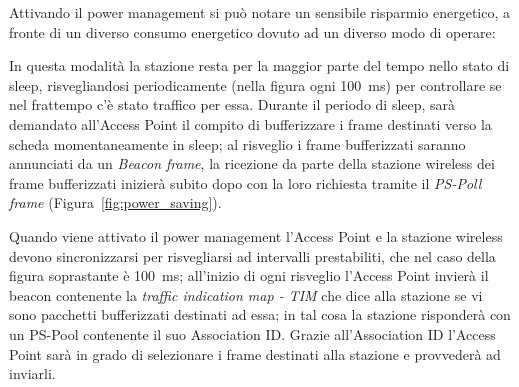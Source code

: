 \begin{figure}[htbp]
\end{figure}

Attivando il power management si pu\`o notare un sensibile risparmio energetico, a fronte di un diverso
consumo energetico dovuto ad un diverso modo di operare: 

\begin{figure}[htbp]
\end{figure}

In questa modalit\`a la stazione resta per la maggior parte del tempo nello stato di sleep, risvegliandosi
periodicamente (nella figura ogni 100~ms) per controllare se nel frattempo c'\`e stato traffico per essa.
Durante il periodo di sleep, sar\`a demandato all'Access Point il compito di bufferizzare i frame destinati
verso la scheda momentaneamente in sleep; al risveglio i frame bufferizzati saranno annunciati da un {\em
Beacon frame}, la ricezione da parte della stazione wireless dei frame bufferizzati inizier\`a subito dopo
con la loro richiesta tramite il {\em PS-Poll frame} (Figura~\ref{fig:power_saving}).

\begin{figure}[htbp]
\end{figure}

Quando viene attivato il power management l'Access Point e la stazione wireless devono sincronizzarsi per
risvegliarsi ad intervalli prestabiliti, che nel caso della figura soprastante \`e 100~ms; all'inizio di
ogni risveglio l'Access Point invier\`a il beacon contenente la {\em traffic indication map - TIM} che dice
alla stazione se vi sono pacchetti bufferizzati destinati ad essa; in tal cosa la stazione risponder\`a con
un PS-Pool contenente il suo Association ID. Grazie all'Association ID l'Access Point sar\`a in grado di
selezionare i frame destinati alla stazione e provveder\`a ad inviarli.
